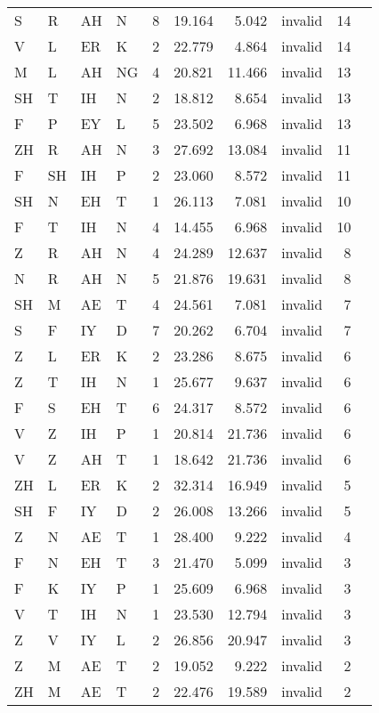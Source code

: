 \begin{longtable}{l@{ } l@{ } l@{ } l r r r r r r}
S  & R  & AH & N  & 8  & 19.164 & 5.042  & invalid & 14 \\
V  & L  & ER & K  & 2  & 22.779 & 4.864  & invalid & 14 \\
M  & L  & AH & NG & 4  & 20.821 & 11.466 & invalid & 13 \\
SH & T  & IH & N  & 2  & 18.812 & 8.654  & invalid & 13 \\
F  & P  & EY & L  & 5  & 23.502 & 6.968  & invalid & 13 \\
ZH & R  & AH & N  & 3  & 27.692 & 13.084 & invalid & 11 \\
F  & SH & IH & P  & 2  & 23.060 & 8.572  & invalid & 11 \\
SH & N  & EH & T  & 1  & 26.113 & 7.081  & invalid & 10 \\
F  & T  & IH & N  & 4  & 14.455 & 6.968  & invalid & 10 \\
Z  & R  & AH & N  & 4  & 24.289 & 12.637 & invalid & 8 \\
N  & R  & AH & N  & 5  & 21.876 & 19.631 & invalid & 8 \\
SH & M  & AE & T  & 4  & 24.561 & 7.081  & invalid & 7 \\
S  & F  & IY & D  & 7  & 20.262 & 6.704  & invalid & 7 \\
Z  & L  & ER & K  & 2  & 23.286 & 8.675  & invalid & 6 \\
Z  & T  & IH & N  & 1  & 25.677 & 9.637  & invalid & 6 \\
F  & S  & EH & T  & 6  & 24.317 & 8.572  & invalid & 6 \\
V  & Z  & IH & P  & 1  & 20.814 & 21.736 & invalid & 6 \\
V  & Z  & AH & T  & 1  & 18.642 & 21.736 & invalid & 6 \\
ZH & L  & ER & K  & 2  & 32.314 & 16.949 & invalid & 5 \\
SH & F  & IY & D  & 2  & 26.008 & 13.266 & invalid & 5 \\
Z  & N  & AE & T  & 1  & 28.400 & 9.222  & invalid & 4 \\
F  & N  & EH & T  & 3  & 21.470 & 5.099  & invalid & 3 \\
F  & K  & IY & P  & 1  & 25.609 & 6.968  & invalid & 3 \\
V  & T  & IH & N  & 1  & 23.530 & 12.794 & invalid & 3 \\
Z  & V  & IY & L  & 2  & 26.856 & 20.947 & invalid & 3 \\
Z  & M  & AE & T  & 2  & 19.052 & 9.222  & invalid & 2 \\
ZH & M  & AE & T  & 2  & 22.476 & 19.589 & invalid & 2 \\

\end{longtable}
